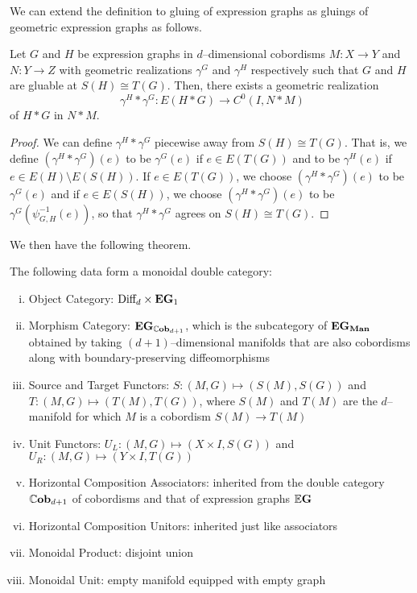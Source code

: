 \documentclass[./Thick_TQFTs_and_Quantum_Information.tex]{subfiles}
\begin{document}
We can extend the definition to gluing of expression graphs as gluings of
geometric expression graphs as follows.

\begin{lem}
Let $G$ and $H$ be expression graphs in $d$--dimensional cobordisms $M : X \to Y$
and $N : Y \to Z$ with geometric realizations $\gamma^G$ and $\gamma^H$
respectively such that $G$ and $H$ are gluable at $S(H) \cong T(G)$. Then, there
exists a geometric realization
\[
  \gamma^H * \gamma^G : E(H * G) \to C^0(I, N * M)
\]
of $H * G$ in $N * M$.
\end{lem}
\begin{proof}
We can define $\gamma^H * \gamma^G$ piecewise away from $S(H) \cong T(G)$. That
is, we define $(\gamma^H * \gamma^G)(e)$ to be $\gamma^G(e)$ if
$e \in E(T(G))$ and to be $\gamma^H(e)$ if $e \in E(H) \setminus E(S(H))$.
If $e \in E(T(G))$, we choose $(\gamma^H * \gamma^G)(e)$ to be $\gamma^G(e)$ and
if $e \in E(S(H))$, we choose $(\gamma^H * \gamma^G)(e)$ to be
$\gamma^G(\psi_{G, H}^{-1}(e))$, so that $\gamma^H * \gamma^G$ agrees on
$S(H) \cong T(G)$.
\end{proof}

We then have the following theorem. 

\begin{thm}
The following data form a monoidal double category:
\begin{enumerate}[(i)]
\setlength{\itemsep}{0pt}
\item Object Category: $\text{Diff}_d \times \textbf{EG}_1$
\item Morphism Category: $\textbf{EG}_{\mathbb{C}\textbf{ob}_{d + 1}}$, which is the subcategory of
$\textbf{EG}_{\textbf{Man}}$ obtained by taking $(d + 1)$--dimensional manifolds that are also
cobordisms along with boundary-preserving diffeomorphisms
\item Source and Target Functors: $S : (M, G) \mapsto (S(M), S(G))$ and
$T : (M, G) \mapsto (T(M), T(G))$, where $S(M)$ and $T(M)$ are the $d$--manifold
for which $M$ is a cobordism $S(M) \to T(M)$
\item Unit Functors: $U_L : (M, G) \mapsto (X \times I, S(G))$ and
$U_R : (M, G) \mapsto (Y \times I, T(G))$
\item Horizontal Composition Associators: inherited from the double category
$\mathbb{C}\textbf{ob}_{d + 1}$ of cobordisms and that of expression graphs $\mathbb{E}\textbf{G}$
\item Horizontal Composition Unitors: inherited just like associators
\item Monoidal Product: disjoint union
\item Monoidal Unit: empty manifold equipped with empty graph
\end{enumerate}
\end{thm}
\end{document}
